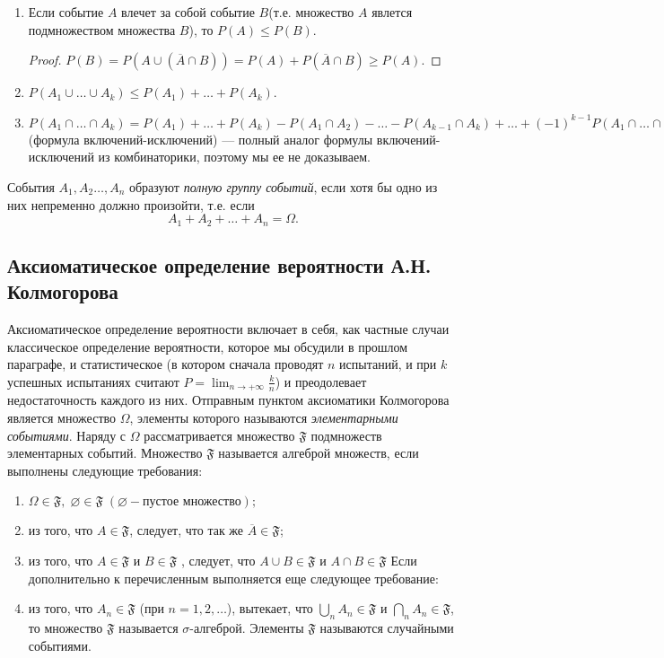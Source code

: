 \begin{enumerate}
\item
Если событие $A$ влечет за собой событие $B$(т.е. множество $A$ явлется подмножеством множества $B$), то $P(A)\le P(B)$.
\begin{proof}
$P(B)=P(A\cup (\overline{A}\cap B))=P(A)+P(\overline{A}\cap B)\ge P(A).$
\end{proof}

\item
$P(A_1\cup\dots\cup A_k) \le P(A_1)+\dots+P(A_k)$.

\item
$P(A_1\cap\dots\cap A_k)= P(A_1)+\dots+P(A_k)-P(A_1\cap A_2)-\dots -P(A_{k-1}\cap A_{k})+ \dots + (-1)^{k-1}P(A_1\cap\dots\cap A_k)  $ (формула включений-исключений) --- полный аналог формулы включений-исключений из комбинаторики, поэтому мы ее не доказываем.
\end{enumerate}

\begin{defn}
События $A_1,A_2\dots,A_n$ образуют \textit{полную группу событий}, если хотя бы одно из них непременно должно произойти, т.е. если
$$
A_1+A_2+\dots+A_n=\Omega.
$$
\end{defn}

\subsection{Аксиоматическое определение вероятности А.Н. Колмогорова}

Аксиоматическое определение вероятности включает в себя, как частные случаи классическое определение вероятности, которое мы обсудили в прошлом параграфе, и статистическое (в котором сначала проводят $n$ испытаний, и при $k$ успешных испытаниях считают $P=\lim_{n \to +\infty}\limits\frac{k}{n}$) и преодолевает недостаточность каждого из них.
Отправным пунктом аксиоматики Колмогорова является множество $\Omega$, элементы которого называются \textit{элементарными событиями}. Наряду с $\Omega$ рассматривается множество $\mathfrak{F}$ подмножеств элементарных событий. Множество $\mathfrak{F}$ называется алгеброй множеств, если выполнены следующие требования:
\begin{enumerate}
\item
$\Omega \in \mathfrak{F},\; \varnothing \in \mathfrak{F} \;(\varnothing - \text{пустое множество});$
\item
из того, что $A \in \mathfrak{F}$, следует, что так же $\overline{A} \in \mathfrak{F}$;
\item
из того, что  $A \in \mathfrak{F}$ и $B \in \mathfrak{F}$ , следует, что $A \cup B \in \mathfrak{F}$ и $A \cap B \in \mathfrak{F}$
Если дополнительно к перечисленным выполняется еще следующее требование:
\item
из того, что $A_n \in \mathfrak{F}$ (при $n = 1,2, \ldots$), вытекает, что $\bigcup\limits_{n} A_n \in \mathfrak{F}$ и $\bigcap\limits_{n} A_n \in \mathfrak{F}$, то множество $\mathfrak{F}$ называется $\sigma$-алгеброй. Элементы $\mathfrak{F}$ называются случайными событиями.
\end{enumerate}

